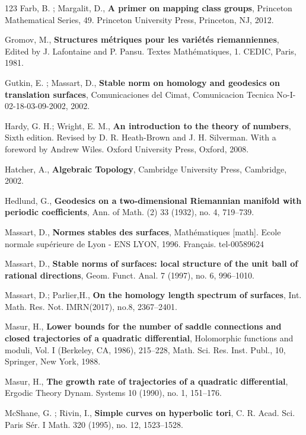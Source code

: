 \documentclass{article}
\theoremstyle{definition}
\begin{document}
\begin{thebibliography}{123}
	 {\sc Farb, B. ; Margalit, D.}, {\bf A primer on mapping class groups}, Princeton Mathematical Series, 49. Princeton University Press, Princeton, NJ, 2012.

     {\sc Gromov, M.}, {\bf Structures métriques pour les variétés riemanniennes}, Edited
by J. Lafontaine and P. Pansu. Textes Mathématiques, 1. CEDIC, Paris, 1981.

     {\sc Gutkin, E. ; Massart, D.}, {\bf Stable norm on homology and geodesics on translation surfaces}, Comunicaciones del Cimat, Comunicacion Tecnica No-I-02-18-03-09-2002, 2002.
    
	 {\sc Hardy, G. H.; Wright, E. M.}, {\bf An introduction to the theory of numbers}, Sixth edition. Revised by D. R. Heath-Brown and J. H. Silverman. With a foreword by Andrew Wiles. Oxford University Press, Oxford, 2008. 
	
	 {\sc Hatcher, A.}, {\bf Algebraic Topology},  Cambridge University Press, Cambridge, 2002.
	
	 {\sc Hedlund, G.}, {\bf Geodesics on a two-dimensional Riemannian manifold with periodic coefficients},  Ann. of Math. (2) 33 (1932), no. 4, 719–739.
	
	  {\sc Massart, D.}, {\bf Normes stables des surfaces}, Mathématiques [math]. Ecole normale supérieure de Lyon - ENS LYON, 1996. Français. tel-00589624
	
	 {\sc  Massart, D.}, {\bf Stable norms of surfaces: local structure of the unit ball of rational directions},  Geom. Funct. Anal. 7 (1997), no. 6, 996–1010.

     {\sc Massart, D.; Parlier,H.}, {\bf On the homology length spectrum of surfaces}, Int. Math. Res. Not. IMRN(2017), no.8, 2367–2401.
    
     {\sc Masur, H.}, {\bf Lower bounds for the number of saddle connections and closed trajectories of a quadratic differential}, Holomorphic functions and moduli, Vol. I (Berkeley, CA, 1986), 215–228,
Math. Sci. Res. Inst. Publ., 10, Springer, New York, 1988. 

     {\sc Masur, H.}, {\bf The growth rate of trajectories of a quadratic differential}, Ergodic Theory Dynam. Systems 10 (1990), no. 1, 151–176.


	 {\sc McShane, G. ; Rivin, I.}, {\bf Simple curves on hyperbolic tori},  C. R. Acad. Sci. Paris Sér. I Math. 320 (1995), no. 12, 1523–1528.
	

\end{thebibliography}
\end{document}
